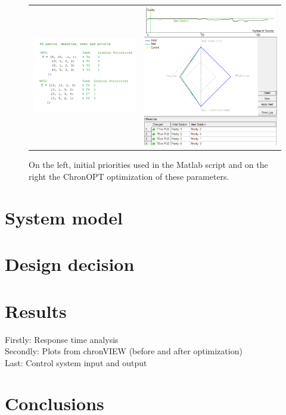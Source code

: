 \begin{figure}[h!]
	\begin{center}
		\begin{tabular}{cc}
		\includegraphics[width=0.5\linewidth]{img/inchron-prios} & \includegraphics[width=0.5\linewidth]{img/optimized}	\\
		\end{tabular}
		\caption{On the left, initial priorities used in the Matlab script and on the right the ChronOPT optimization of these parameters. }
		\label{fig:inchronprios}
	\end{center}
\end{figure}




\section{System model}

\section{Design decision}



\section{Results}

Firstly: Response time analysis\\
Secondly: Plots from chronVIEW (before and after optimization)\\
Last: Control system input and output

\section{Conclusions}